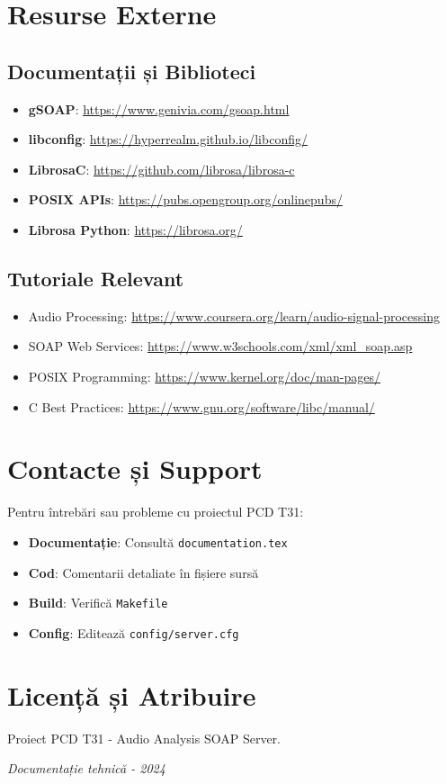 \documentclass[12pt,a4paper,oneside]{book}
\begin{document}
\section{Resurse Externe}

\subsection{Documentații și Biblioteci}

\begin{itemize}
    \item \textbf{gSOAP}: \url{https://www.genivia.com/gsoap.html}
    \item \textbf{libconfig}: \url{https://hyperrealm.github.io/libconfig/}
    \item \textbf{LibrosaC}: \url{https://github.com/librosa/librosa-c}
    \item \textbf{POSIX APIs}: \url{https://pubs.opengroup.org/onlinepubs/}
    \item \textbf{Librosa Python}: \url{https://librosa.org/}
\end{itemize}

\subsection{Tutoriale Relevant}

\begin{itemize}
    \item Audio Processing: \url{https://www.coursera.org/learn/audio-signal-processing}
    \item SOAP Web Services: \url{https://www.w3schools.com/xml/xml_soap.asp}
    \item POSIX Programming: \url{https://www.kernel.org/doc/man-pages/}
    \item C Best Practices: \url{https://www.gnu.org/software/libc/manual/}
\end{itemize}

\section{Contacte și Support}

Pentru întrebări sau probleme cu proiectul PCD T31:

\begin{itemize}
    \item \textbf{Documentație}: Consultă \texttt{documentation.tex}
    \item \textbf{Cod}: Comentarii detaliate în fișiere sursă
    \item \textbf{Build}: Verifică \texttt{Makefile}
    \item \textbf{Config}: Editează \texttt{config/server.cfg}
\end{itemize}

\section{Licență și Atribuire}

Proiect PCD T31 - Audio Analysis SOAP Server.

\textit{Documentație tehnică - 2024}
\end{document}
